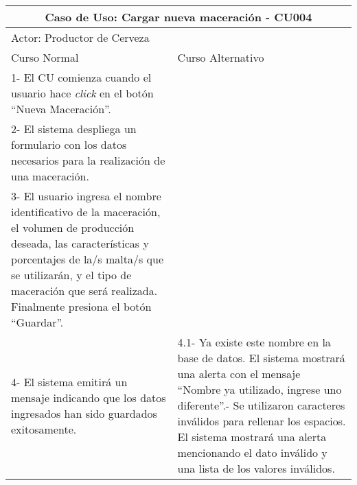     
    \begin{minipage}{0.95\textwidth}
    \begin{center}
    \begin{tabularx}{\textwidth}{ | X | X |}
        \hline
        \multicolumn{2}{|c|}{\textbf{Caso de Uso: Cargar nueva maceración - CU004}} \\
        \hline
        \multicolumn{2}{|l|}{Actor: Productor de Cerveza} \\
        \hline
        Curso Normal & Curso Alternativo \\
        \hline
        1- El CU comienza cuando el usuario hace \textit{click} en el botón “Nueva Maceración”. & \\
        \hline
        2- El sistema despliega un formulario con los datos necesarios para la realización de una maceración. &
        \\
        \hline
        3- El usuario ingresa el nombre identificativo de la maceración, el volumen de producción deseada, las características y porcentajes de la/s malta/s que se utilizarán, y el tipo de maceración que será realizada. Finalmente presiona el botón “Guardar”. &
        \\
        \hline
        4- El sistema emitirá un mensaje indicando que los datos ingresados han sido guardados exitosamente.  & 
        4.1- Ya existe este nombre en la base de datos. El sistema mostrará una alerta con el mensaje “Nombre ya utilizado, ingrese uno diferente”.\newline 4.2- Se utilizaron caracteres inválidos para rellenar los espacios. El sistema mostrará una alerta mencionando el dato inválido y una lista de los valores inválidos.
        \\
        \hline
    \end{tabularx}
    \label{CU004}
    \end{center}
    \end{minipage}
    
